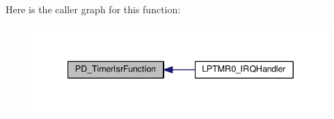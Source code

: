 Here is the caller graph for this function\-:
\nopagebreak
\begin{figure}[H]
\begin{center}
\leavevmode
\includegraphics[width=340pt]{group__usb__pd__stack_gad8420ee79286dfb87b1b9d9c0845f31d_icgraph}
\end{center}
\end{figure}


